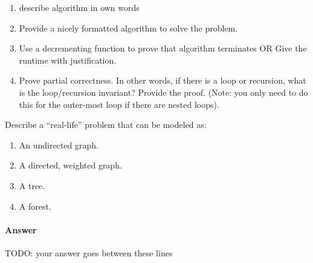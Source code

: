 \documentclass{article}
\begin{document}
\begin{enumerate}[label=(\alph*)]
\begin{enumerate}[label=\alph*)]
            \item describe algorithm in own words
            \item Provide a nicely formatted algorithm to solve the problem.
            \item Use a decrementing function to prove that algorithm terminates OR  Give the runtime with justification.
            \item Prove partial correctness.
            In other words, if there is a loop or recursion, what is the loop/recursion invariant? Provide the proof.
            (Note: you only need to do this for the outer-most loop if there are nested loops).
        \end{enumerate}
\end{enumerate}





\nextprob
{}

Describe a ``real-life'' problem that can be modeled as:

\begin{enumerate}
    \item An undirected graph.
    \item A directed, weighted graph.
    \item A tree.
    \item A forest.
\end{enumerate}

\paragraph{Answer}


TODO: your answer goes between these lines
\end{document}

